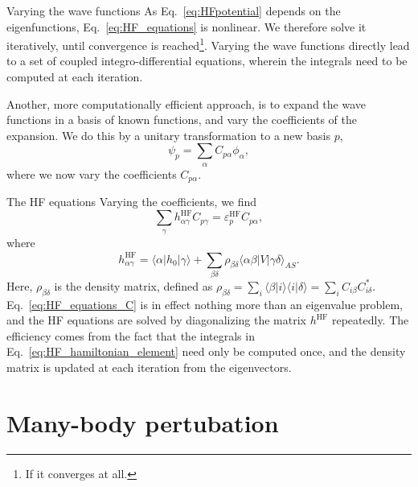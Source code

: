 \documentclass[UKenglish,aspectratio=169]{beamer}
\begin{document}
\begin{frame}{Varying the wave functions}
    As Eq.~\eqref{eq:HFpotential} depends on the eigenfunctions, Eq.~\eqref{eq:HF_equations} is nonlinear.
    We therefore solve it iteratively, until convergence is reached\footnote{If it converges at all.}.
    Varying the wave functions directly lead to a set of coupled integro-differential equations, wherein the integrals need to be computed at each iteration.

    \bigskip

    Another, more computationally efficient approach, is to expand the wave functions in a basis of known functions, and vary the coefficients of the expansion.
    We do this by a unitary transformation to a new basis $p$,
    \begin{equation}
        \psi_p = \sum_{\alpha} C_{p\alpha} \phi_\alpha,
    \end{equation}
    where we now vary the coefficients $C_{p\alpha}$.
\end{frame}

\begin{frame}{The HF equations}
    Varying the coefficients, we find
    \begin{equation}\label{eq:HF_equations_C}
        \sum_{\gamma} h_{\alpha\gamma}^{\mathrm{HF}} C_{p \gamma} = \varepsilon_p^{\mathrm{HF}} C_{p \alpha},
    \end{equation}
    where
    \begin{equation}\label{eq:HF_hamiltonian_element}
        h_{\alpha \gamma}^\mathrm{HF}
        = \langle \alpha \vert \hat{h}_0 \vert \gamma \rangle
        + \sum_{\beta\delta} \rho_{\beta\delta} \langle \alpha\beta \vert V \vert \gamma\delta \rangle_{AS}.
    \end{equation}
    Here, $\rho_{\beta\delta}$ is the density matrix, defined as $\rho_{\beta\delta} = \sum_{i} \langle \beta \vert i \rangle \langle i \vert \delta \rangle = \sum_{i} C_{i\beta} C_{i\delta}^*$.
    Eq.~\eqref{eq:HF_equations_C} is in effect nothing more than an eigenvalue problem, and the HF equations are solved by diagonalizing the matrix $h^\mathrm{HF}$ repeatedly.
    The efficiency comes from the fact that the integrals in Eq.~\eqref{eq:HF_hamiltonian_element} need only be computed once, and the density matrix is updated at each iteration from the eigenvectors.
\end{frame}

\section{Many-body pertubation}
\end{document}
